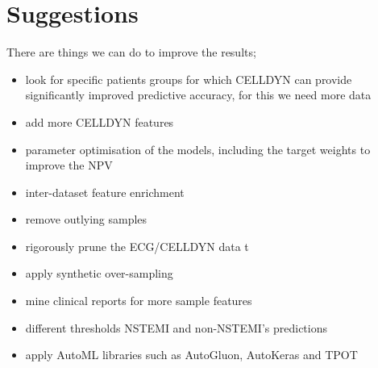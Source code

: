 \documentclass[a4paper,10pt]{article}
\begin{document}
\section{Suggestions}
There are things we can do to improve the results;
%
\begin{itemize}
\item look for specific patients groups for which CELLDYN can provide significantly improved predictive accuracy, for this we need more data
\item add more CELLDYN features
\item parameter optimisation of the models, including the target weights to improve the NPV
\item inter-dataset feature enrichment 
\item remove outlying samples
\item rigorously prune the ECG/CELLDYN data t
\item apply synthetic over-sampling 
\item mine clinical reports for more sample features
\item different thresholds NSTEMI and non-NSTEMI's predictions
\item apply AutoML libraries such as AutoGluon, AutoKeras and TPOT
\end{itemize}
\end{document}

